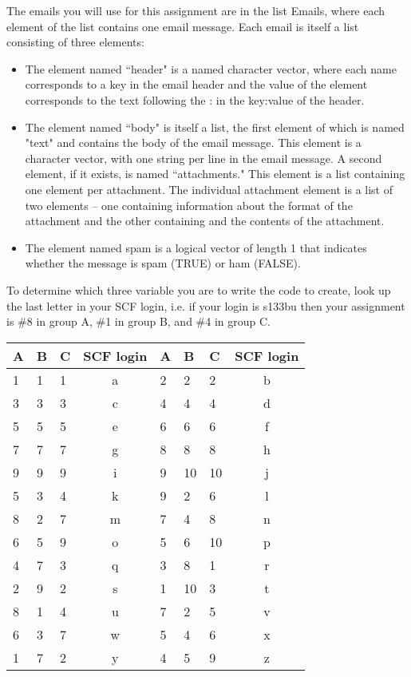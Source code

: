 \documentclass[12pt]{article}
\begin{document}
The emails you will use for this assignment are in the list Emails, 
where each element of the list contains one email message.
Each email is itself a list consisting of three elements:
\begin{itemize}
\item The element named ``header" is a named character vector,
where each name corresponds to a key in the email header
and the value of the element corresponds to the text following the
: in the key:value of the header.
\item The element named ``body" is itself a list, the first element
of which is named "text" and contains the body of the email message.
This element is a character vector, with one string per line in the
email message.
A second element, if it exists, is named ``attachments." This
element is a list containing one element per attachment.
The individual attachment element is a list of two elements --
one containing information about the format of the attachment and the
other containing and the contents of the attachment.
\item The element named spam is a logical vector of length 1 
that indicates whether the message is spam (TRUE) or ham (FALSE).
\end{itemize}

To determine which three variable you are to write the code to create,
look up the last letter in your SCF login, i.e. if your login is 
s133bu then your assignment is \#8 in group A, \#1 in group B,
and \#4 in group C.

\begin{tabular}{lllc|lllc}
A & B & C & SCF login & A & B & C & SCF login\\
\hline
1 & 1 & 1 & a  & 2 & 2 & 2 & b\\
3 & 3 & 3 & c & 4 & 4 & 4 & d\\
5 & 5 & 5 & e & 6 & 6 & 6 & f\\
7 & 7 & 7 & g & 8 & 8 & 8 & h\\
9 & 9 & 9 & i & 9 & 10 & 10 & j\\
5 & 3 & 4 & k & 9 & 2 & 6 & l\\
8 & 2 & 7 & m & 7 & 4 & 8 & n\\
6 & 5 & 9 & o & 5 & 6 & 10 & p\\
4 & 7 & 3 & q & 3 & 8 & 1 & r\\
2 & 9 & 2 & s & 1 & 10 & 3 & t\\
8 & 1 & 4 & u & 7 & 2 & 5 & v\\
6 & 3 & 7 & w & 5 & 4 & 6 & x\\
1 & 7 & 2 & y & 4 & 5 & 9 & z \\
\end{tabular}
\end{document}
